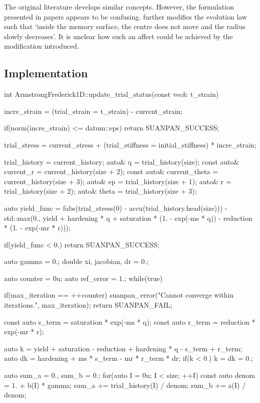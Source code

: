 The original literature \cite{Ohno1982,Nouailhas1985} develops similar concepts.
However, the formulation presented in papers appears to be confusing.
\cite{Nouailhas1985} further modifies the evolution law such that `inside the memory surface, the centre does not move and the radius slowly decreases'.
It is unclear how such an affect could be achieved by the modification introduced.
\subsection{Implementation}
\begin{cppcode}
int ArmstrongFrederick1D::update_trial_status(const vec& t_strain) {
    incre_strain = (trial_strain = t_strain) - current_strain;

    if(norm(incre_strain) <= datum::eps) return SUANPAN_SUCCESS;

    trial_stress = current_stress + (trial_stiffness = initial_stiffness) * incre_strain;

    trial_history = current_history;
    auto& q = trial_history(size);
    const auto& current_r = current_history(size + 2);
    const auto& current_theta = current_history(size + 3);
    auto& ep = trial_history(size + 1);
    auto& r = trial_history(size + 2);
    auto& theta = trial_history(size + 3);

    auto yield_func = fabs(trial_stress(0) - accu(trial_history.head(size))) - std::max(0., yield + hardening * q + saturation * (1. - exp(-ms * q)) - reduction * (1. - exp(-mr * r)));

    if(yield_func < 0.) return SUANPAN_SUCCESS;

    auto gamma = 0.;
    double xi, jacobian, dr = 0.;

    auto counter = 0u;
    auto ref_error = 1.;
    while(true) {
        if(max_iteration == ++counter) {
            suanpan_error("Cannot converge within {} iterations.\n", max_iteration);
            return SUANPAN_FAIL;
        }

        const auto s_term = saturation * exp(-ms * q);
        const auto r_term = reduction * exp(-mr * r);

        auto k = yield + saturation - reduction + hardening * q - s_term + r_term;
        auto dk = hardening + ms * s_term - mr * r_term * dr;
        if(k < 0.) k = dk = 0.;

        auto sum_a = 0., sum_b = 0.;
        for(auto I = 0u; I < size; ++I) {
            const auto denom = 1. + b(I) * gamma;
            sum_a += trial_history(I) / denom;
            sum_b += a(I) / denom;
        }

}}
\end{cppcode}
